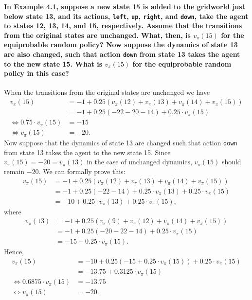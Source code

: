 \documentclass[a4paper,11pt]{article}
\numberwithin{equation}{section}
\theoremstyle{remark}
\begin{document}
\textbf{In Example 4.1, suppose a new state 15 is added to the gridworld just below state 13, and its actions, \texttt{left}, \texttt{up}, \texttt{right}, and \texttt{down}, take the agent to states 12, 13, 14, and 15, respectively. Assume that the transitions from the original states are unchanged. What, then, is $v_\pi(15)$ for the equiprobable random policy? Now suppose the dynamics of state 13 are also changed, such that action \texttt{down} from state 13 takes the agent to the new state 15. What is $v_\pi(15)$ for the equiprobable random policy in this case?}
\\ \\
When the transitions from the original states are unchanged we have
\begin{align*}
	v_\pi(15) & = -1 + 0.25 (v_\pi(12)+ v_\pi(13) + v_\pi(14) + v_\pi(15)) \\
			  & = -1 + 0.25 (-22 -20 -14) + 0.25 \cdot v_\pi(15) \\
	\iff 0.75 \cdot v_\pi(15) & = -15 \\
	\iff v_\pi(15) & = -20.
\end{align*}
Now suppose that the dynamics of state 13 are changed such that action \texttt{down} from state 13 takes the agent to the new state 15. Since $v_\pi(15) = -20 = v_\pi(13)$ in the case of unchanged dynamics, $v_\pi(15)$ should remain $-20$. We can formally prove this:
\begin{align*}
	v_\pi(15) & = -1 + 0.25 (v_\pi(12)+ v_\pi(13) + v_\pi(14) + v_\pi(15)) \\
	& = -1 + 0.25 (-22 -14) + 0.25 \cdot v_\pi(13) + 0.25 \cdot v_\pi(15) \\
	& = -10 + 0.25 \cdot v_\pi(13) + 0.25 \cdot v_\pi(15),
\end{align*}
where
\begin{align*}
	v_\pi(13) & = -1 + 0.25 (v_\pi(9)+ v_\pi(12) + v_\pi(14) + v_\pi(15)) \\
	& = -1 + 0.25 (-20 -22 -14) + 0.25 \cdot v_\pi(15) \\
	& = -15 + 0.25 \cdot v_\pi(15).
\end{align*}
Hence,
\begin{align*}
	v_\pi(15) & = -10 + 0.25 (-15 + 0.25 \cdot v_\pi(15)) + 0.25 \cdot v_\pi(15) \\
			  & = -13.75 + 0.3125 \cdot v_\pi(15) \\
	\iff 0.6875 \cdot v_\pi(15) & = -13.75 \\
	\iff v_\pi(15) & = -20.
\end{align*}
\end{document}
